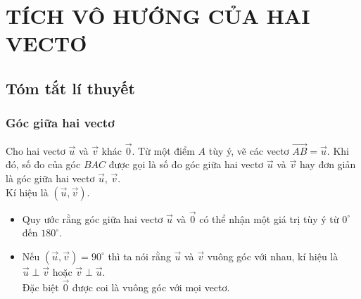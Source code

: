 \newpage\setcounter{dang}{0}
\section{TÍCH VÔ HƯỚNG CỦA HAI VECTƠ}
\subsection{Tóm tắt lí thuyết}
\subsubsection{Góc giữa hai vectơ }
\immini
{
		Cho hai vectơ $\vec{u}$ và $\vec{v}$ khác $\vec{0}$. Từ một điểm $A$ tùy ý, vẽ các vectơ $\vec{AB}=\vec{u}$. Khi đó, số đo của góc $BAC$ được gọi là số đo góc giữa hai vectơ  $\vec{u}$ và $\vec{v}$ hay đơn giản là góc giữa hai vectơ $\vec{u}$, $\vec{v}$.\\ Kí hiệu là $\left(\vec{u},\vec{v}\right)$.
}
{
}
\begin{note}
	\begin{itemize}
		\item Quy ước rằng góc giữa hai vectơ $\vec{u}$ và $\vec{0}$ có thể nhận một giá trị tùy ý từ $0^\circ$ đến $180^\circ$.
		\item Nếu $\left(\vec{u},\vec{v}\right)=90^\circ$ thì ta nói rằng  $\vec{u}$ và $\vec{v}$ vuông góc với nhau, kí hiệu là $\vec{u} \perp \vec{v}$ hoặc $\vec{v} \perp \vec{u}$. \\
		Đặc biệt $\vec{0}$ được coi là vuông góc với mọi vectơ.
	\end{itemize}
\end{note}


